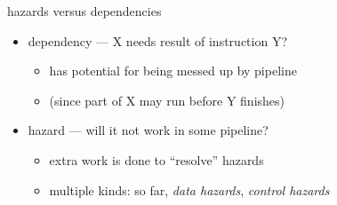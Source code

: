
\begin{frame}{hazards versus dependencies}
    \begin{itemize}
        \item dependency --- X needs result of instruction Y?
            \begin{itemize}
                \item has potential for being messed up by pipeline
                \item (since part of X may run before Y finishes)
            \end{itemize}
        \item hazard --- will it not work in some pipeline?
            \begin{itemize}
                \item {} extra work is done to ``resolve'' hazards
                \item multiple kinds: so far, \textit{data hazards}, \textit{control hazards}
            \end{itemize}
    \end{itemize}
\end{frame}

